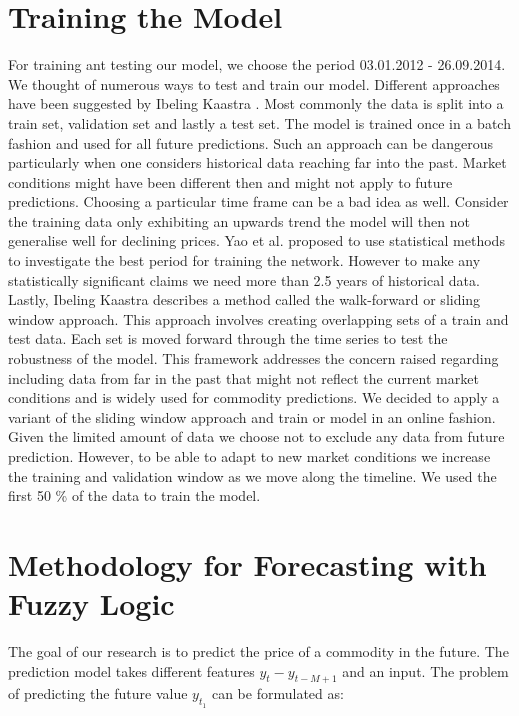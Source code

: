 \section{Training the Model}

For training ant testing our model, we choose the period 03.01.2012 - 26.09.2014. We thought of numerous ways to test and train our model. Different approaches have been suggested by Ibeling Kaastra \cite{Kaastra96designinga}. Most commonly the data is split into a train set, validation set and lastly a test set. The model is trained once in a batch fashion and used for all future predictions. Such an approach can be dangerous particularly when one considers historical data reaching far into the past. Market conditions might have been different then and might not apply to future predictions. Choosing a particular time frame can be a bad idea as well. Consider the training data only exhibiting an upwards trend the model will then not generalise well for declining prices. Yao et al. \cite{Yao00acase} proposed to use statistical methods to investigate the best period for training the network. However to make any statistically significant claims we need more than 2.5 years of historical data. Lastly, Ibeling Kaastra describes a method called the walk-forward or sliding window approach. This approach involves creating overlapping sets of a train and test data. Each set is moved forward through the time series to test the robustness of the model. This framework addresses the concern raised regarding including data from far in the past that might not reflect the current market conditions and is widely used for commodity predictions. We decided to apply a variant of the sliding window approach and train or model in an online fashion. Given the limited amount of data we choose not to exclude any data from future prediction. However, to be able to adapt to new market conditions we increase the training and validation window as we move along the timeline. We used the first 50 \% of the data to train the model. 


\section{Methodology for Forecasting with Fuzzy Logic}
\label{5.5}

The goal of our research is to predict the price of a commodity in the future. The prediction model takes different features $y_t - y_{t-M+1}$ and an input. The problem of predicting the future value $y_{t_1}$ can be formulated as: 


